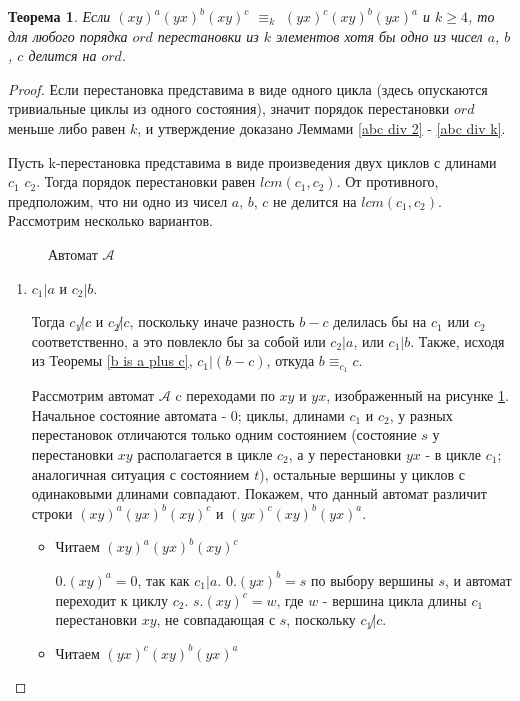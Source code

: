 \documentclass[12pt]{article}
\newtheorem{theorem}{Теорема}
\newcommand{\scalingimage}[3]{
	\begin{figure}
		\center{
			\texttt{[image: \#1]}
		}
		\caption{#3}
		\label{fig:#1}
	\end{figure}
}
\begin{document}
	\begin{theorem}
		Если $(xy)^a(yx)^b(xy)^c$ $\equiv_k$ $(yx)^c(xy)^b(yx)^a$ и $k \ge 4$, то для любого порядка $ord$ перестановки из $k$ элементов хотя бы одно из чисел $a$, $b$, $c$ делится на $ord$.
	\end{theorem}
	\begin{proof}
		Если перестановка представима в виде одного цикла (здесь опускаются тривиальные циклы из одного состояния), значит порядок перестановки $ord$ меньше либо равен $k$, и утверждение доказано Леммами \ref{abc div 2} - \ref{abc div k}.
		
		Пусть k-перестановка представима в виде произведения двух циклов с длинами $c_1$ $c_2$. Тогда порядок перестановки равен $lcm(c_1, c_2)$. От противного, предположим, что ни одно из чисел $a$, $b$, $c$ не делится на $lcm(c_1, c_2)$. Рассмотрим несколько вариантов.
		\scalingimage{2_cycles}{0.5}{Автомат $\mathscr{A}$}
		
		\begin{enumerate}
			\item $c_1 | a$ и $c_2 | b$.
			
			Тогда $c_1 \not | c$ и $c_2 \not | c$, поскольку иначе разность $b-c$ делилась бы на $c_1$ или $c_2$ соответственно, а это повлекло бы за собой или $c_2 | a$, или $c_1 | b$. Также, исходя из Теоремы \ref{b is a plus c}, $c_1 | (b-c)$, откуда $b \equiv_{c_1} c$.
			
			Рассмотрим автомат $\mathscr{A}$ c переходами по $xy$ и $yx$, изображенный на рисунке \ref{fig:2_cycles}. Начальное состояние автомата - $0$; циклы, длинами $c_1$ и $c_2$, у разных перестановок отличаются только одним состоянием (состояние $s$ у перестановки $xy$ располагается в цикле $c_2$, а у перестановки $yx$ - в цикле $c_1$; аналогичная ситуация с состоянием $t$), остальные вершины у циклов с одинаковыми длинами совпадают. Покажем, что данный автомат различит строки $(xy)^a(yx)^b(xy)^c$ и $(yx)^c(xy)^b(yx)^a$.
			
			\begin{itemize}
				\item Читаем $(xy)^a(yx)^b(xy)^c$
				
				$0.(xy)^a = 0$, так как $c_1 | a$. $0.(yx)^b = s$ по выбору вершины $s$, и автомат переходит к циклу $c_2$. $s.(xy)^c = w$, где $w$ - вершина цикла длины $c_1$ перестановки $xy$, не совпадающая с $s$, поскольку $c_1 \not | c$. 
				
				\item Читаем $(yx)^c(xy)^b(yx)^a$
				

\end{itemize}
\end{enumerate}
\end{proof}
\end{document}
